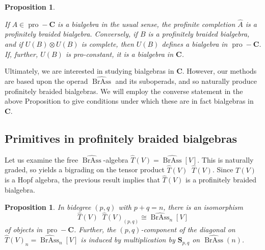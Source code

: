 \documentclass[12pt]{article}
\DeclareMathOperator{\pro}{pro}
\DeclareMathOperator{\BrAss}{BrAss}
\DeclareMathOperator{\hattimes}{\widehat{\otimes}}
\newcommand{\Ahat}{\widehat{A}}
\newcommand{\BrAsshat}{\widehat{\BrAss}} %
\newcommand{\That}{\widehat{T}}
\newcommand{\bC} {\mathbf{C}}
\newcommand{\proC}{\pro\!-\bC}
\newcommand{\bS} {\mathbf{S}}
\theoremstyle{plain}
\newtheorem{prop}[thm]{Proposition}
\theoremstyle{definition}
\theoremstyle{remark}
\begin{document}
\begin{prop} \label{reverse_bialg_prop}

If $A \in \proC$ is a bialgebra in the usual sense, the profinite completion $\Ahat$ is a profinitely braided bialgebra.  Conversely, if $B$ is a profinitely braided bialgebra, and if $U(B) \otimes U(B)$ is complete, then $U(B)$ defines a bialgebra in $\proC$.  If, further, $U(B)$ is pro-constant, it is a bialgebra in $\bC$. 

\end{prop}

Ultimately, we are interested in studying bialgebras in $\bC$.  However, our methods are based upon the operad $\BrAsshat$ and its suboperads, and so naturally produce profinitely braided bialgebras.  We will employ the converse statement in the above Proposition to give conditions under which these are in fact bialgebras in $\bC$.

\subsection{Primitives in profinitely braided bialgebras}

Let us examine the free $\BrAsshat$-algebra $\That(V) = \BrAsshat[V]$.  This is naturally graded, so yields a bigrading on the tensor product $\That(V) \hattimes \That(V)$.  Since $T(V)$ is a Hopf algebra, the previous result implies that $\That(V)$ is a profinitely braided bialgebra.

\begin{prop} 

In bidegree $(p, q)$ with $p+q=n$, there is an isomorphism
%
$$\That(V) \hattimes \That(V)_{(p,q)} \cong \BrAsshat_n[V]$$
%
of objects in $\proC$.  Further, the $(p,q)$-component of the diagonal on $\That(V)_n = \BrAsshat_n[V]$ is induced by multiplication by $\bS_{p, q}$ on $\BrAsshat(n)$.

\end{prop}
\end{document}

